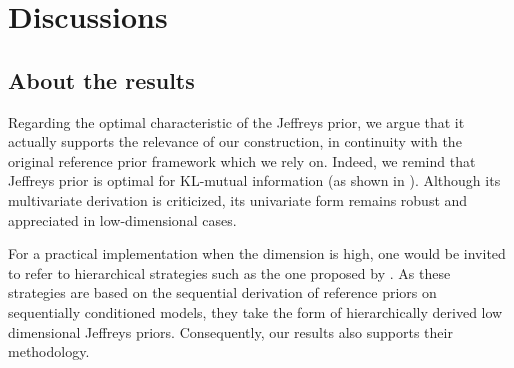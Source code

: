 \section{Discussions}\label{sec:PSGSA:discussion}


    \subsection{About the results}




Regarding the optimal characteristic of the Jeffreys prior, we argue that it actually supports  the relevance of our construction, in continuity with the original reference prior framework which we rely on. Indeed, we remind that Jeffreys prior is optimal for KL-mutual information (as shown in \cite{clarke_jeffreys_1994}). Although its multivariate derivation is criticized, its univariate form remains robust and appreciated in low-dimensional cases.


For a practical implementation when the dimension is high, one would be invited to refer to hierarchical strategies such as the one proposed by \citet{berger_overall_2015}. 
As these strategies are based on the sequential derivation of reference priors on sequentially conditioned models, they take the form of hierarchically derived low dimensional Jeffreys priors. Consequently, our results also supports their methodology.

